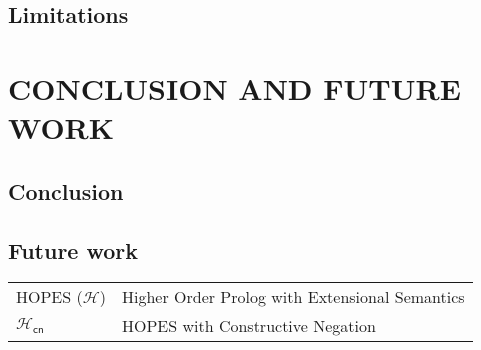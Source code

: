 \documentclass[inscr,ack,preface]{dithesis}
\theoremstyle{definition}
\newcommand{\hcn}{$\mathcal{H}_\mathsf{cn}$}
\begin{document}
\section{Limitations}

\chapter{CONCLUSION AND FUTURE WORK}
\label{chap:conclusion}

\section{Conclusion}

\section{Future work}

\backmatter

\abbreviations
\begin{center}
	\renewcommand{\arraystretch}{1.5}
	\begin{longtable}{ l @{\qquad} l }
	\toprule
	  HOPES ($\mathcal{H}$)    & Higher Order Prolog with Extensional Semantics \\
    \hcn{}   & HOPES with Constructive Negation \\
	\bottomrule
	\end{longtable}
\end{center}

%
%
%



\end{document}
